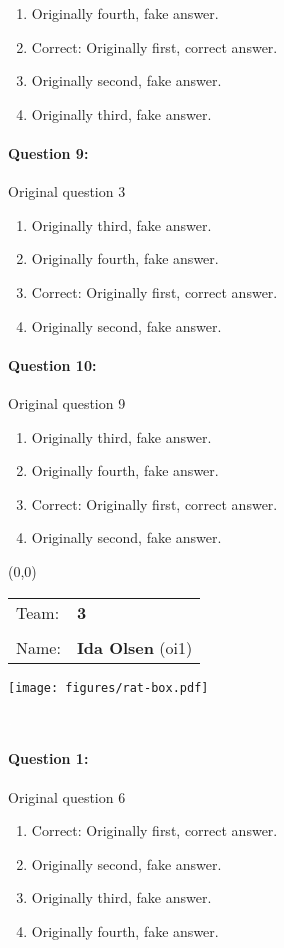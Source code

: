 \documentclass[9pt, twoside, twocolumn]{extarticle}
\renewcommand{\includegraphics}[2][]{\OldIncludegraphics[width=\linewidth, #1]{#2}}
\newcommand{\individualprefix}[3]{%
\begin{textblock}{3.5}(0,0)
\fontfamily{phv}\selectfont
\begin{tabular}{ll}
Team: & \Large\linespread{6} \textbf{#3}\\
      & \\
Name: & \Large\linespread{6} \textbf{#1} (#2)
\end{tabular}

\texttt{[image: figures/rat-box.pdf]}
\end{textblock}
\textcolor{white}{.}\\ %
\vspace{6cm}
}%
\begin{document}
\begin{enumerate}[label=\textbf{{\Alph*}},labelindent=0pt, labelsep=1.5em, parsep=0.2em]
\item Originally fourth, fake answer.
\item Correct: Originally first, correct answer.
\item Originally second, fake answer.
\item Originally third, fake answer.
\end{enumerate}
\paragraph{Question 9:}
Original question 3

\begin{enumerate}[label=\textbf{{\Alph*}},labelindent=0pt, labelsep=1.5em, parsep=0.2em]
\item Originally third, fake answer.
\item Originally fourth, fake answer.
\item Correct: Originally first, correct answer.
\item Originally second, fake answer.
\end{enumerate}
\paragraph{Question 10:}
Original question 9

\begin{enumerate}[label=\textbf{{\Alph*}},labelindent=0pt, labelsep=1.5em, parsep=0.2em]
\item Originally third, fake answer.
\item Originally fourth, fake answer.
\item Correct: Originally first, correct answer.
\item Originally second, fake answer.
\end{enumerate}
\cleardoublepage
\newpage

\individualprefix{Ida Olsen}{oi1}{3}

\paragraph{Question 1:}
Original question 6

\begin{enumerate}[label=\textbf{{\Alph*}},labelindent=0pt, labelsep=1.5em, parsep=0.2em]
\item Correct: Originally first, correct answer.
\item Originally second, fake answer.
\item Originally third, fake answer.
\item Originally fourth, fake answer.
\end{enumerate}
\end{document}
